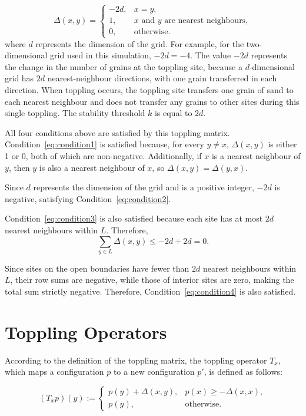 \begin{equation}
	\Delta(x,y)=
	\begin{cases}
		-2d, & x=y,\\
		1, & x \text{ and } y \text{ are nearest neighbours},\\
		0, & \text{otherwise}.
	\end{cases}
	\tag{5}\label{eq:btw_toppling}
\end{equation}
where $d$ represents the dimension of the grid. For example, for the two-dimensional grid used in this simulation, $-2d=-4$. The value $-2d$ represents the change in the number of grains at the toppling site, because a $d$-dimensional grid has $2d$ nearest-neighbour directions, with one grain transferred in each direction. When toppling occurs, the toppling site transfers one grain of sand to each nearest neighbour and does not transfer any grains to other sites during this single toppling. The stability threshold $k$ is equal to $2d$.

All four conditions above are satisfied by this toppling matrix. Condition~\eqref{eq:condition1} is satisfied because, for every $y \ne x$, $\Delta(x,y)$ is either 1 or 0, both of which are non-negative. Additionally, if $x$ is a nearest neighbour of $y$, then $y$ is also a nearest neighbour of $x$, so $\Delta(x,y)=\Delta(y,x)$.

Since $d$ represents the dimension of the grid and is a positive integer, $-2d$ is negative, satisfying Condition~\eqref{eq:condition2}.

Condition~\eqref{eq:condition3} is also satisfied because each site has at most $2d$ nearest neighbours within $L$. Therefore,
$$\sum_{y\in L}\Delta(x,y)\leq -2d+2d=0.$$

Since sites on the open boundaries have fewer than $2d$ nearest neighbours within $L$, their row sums are negative, while those of interior sites are zero, making the total sum strictly negative. Therefore, Condition~\eqref{eq:condition4} is also satisfied.

\section{Toppling Operators}
According to the definition of the toppling matrix, the toppling
operator $T_x$, which maps a configuration $p$ to a new configuration
$p'$, is defined as follows:

\begin{equation}
	(T_xp)(y):=
	\begin{cases}
		p(y)+\Delta(x,y), & p(x)\geq -\Delta(x,x),\\
		p(y), & \text{otherwise}.
	\end{cases}
	\tag{6}\label{eq:toppling_operator}
\end{equation}

